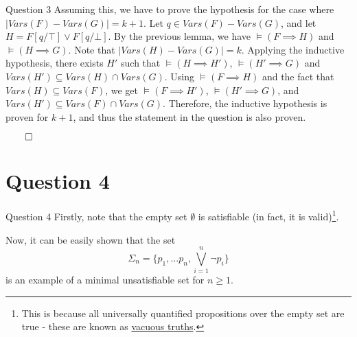 \documentclass{beamer}
\begin{document}
{\begin{frame}{Question 3}
            Assuming this, we have to prove the hypothesis for the case where $|Vars(F) - Vars(G)| = k + 1$. Let $q \in Vars(F) - Vars(G)$, and let $H = F[q/\top] \lor F[q/\bot]$. By the previous lemma, we have $\vDash (F \implies H)$ and $\vDash (H \implies G)$. Note that $|Vars(H) - Vars(G)| = k$. Applying the inductive hypothesis, there exists $H'$ such that $\vDash (H \implies H')$, $\vDash (H' \implies G)$ and $Vars(H') \subseteq Vars(H) \cap Vars(G)$. Using $\vDash (F \implies H)$ and the fact that $Vars(H) \subseteq Vars(F)$, we get $\vDash (F \implies H')$, $\vDash (H' \implies G)$, and $Vars(H') \subseteq Vars(F) \cap Vars(G)$. Therefore, the inductive hypothesis is proven for $k + 1$, and thus the statement in the question is also proven.

            $\qed$
        \end{frame}
    }
    \section{Question 4}
    {
        \begin{frame}{Question 4}
            Firstly, note that the empty set $\emptyset$ is satisfiable (in fact, it is valid)\footnote{This is because all universally quantified propositions over the empty set are true - these are known as \href{https://en.wikipedia.org/wiki/Vacuous_truth}{vacuous truths}.}. 

            Now, it can be easily shown that the set
            \begin{equation*}
                \Sigma_{n} = \{p_{1}, \dots p_{n}, \bigvee\limits_{i = 1}^{n} \neg p_{i}\}
            \end{equation*} is an example of a minimal unsatisfiable set for $n \geq 1$.
        \end{frame}
    }
\end{document}
